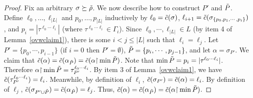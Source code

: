 \begin{proof}
Fix an arbitrary $\sigma\succeq\tilde{\rho}$.
We now describe how to construct $P'$ and $\tilde{P}$.
Define $\ell_0, \dots, \ell_{|L|}$
and $p_0, \dots, p_{|L|}$ inductively by
$\ell_0 = \tilde{c}(\sigma)$,
$\ell_{i+1} = \tilde{c}(\sigma_{\{p_0,p_1,\cdots,p_i\}})$, and
$p_{i} =|\tau^{\ell_0\cdots \ell_{i}}|$ (where $\tau^{\ell_0\cdots \ell_{i}} \in \Gamma_i$).
%
%
%
%
%
%
Since $\ell_0,\cdots,\ell_{|L|}\in L$ (by item 4 of Lemma~\ref{ovwclaim1}), there is some $i<j\leq |L|$
such that $\ell_i=\ell_j $.
Let $P' = \{p_0,\cdots,p_{i-1}\}$
(if $i=0$ then $P' = \emptyset$),
$\tilde{P}= \{p_i,\cdots,p_{j-1}\}$,
and let $\alpha = \sigma_{P'}$. We claim that
$\tilde{c}(\alpha) = \tilde{c}(\alpha_{\tilde{P}}) = \tilde{c}(\alpha{\upharpoonright} \min \tilde{P})$.
Note that $\min \tilde{P}  =p_i= |\tau^{\ell_0\cdots \ell_i}|$.
Therefore
$\alpha{\upharpoonright} \min \tilde{P} = \tau^{\ell_0\cdots \ell_i}_{P'}$.
By item 3 of Lemma~\ref{ovwclaim1},
we have $\tilde{c}(\tau^{\ell_0\cdots \ell_i}_{P'}) = \ell_i $.
Meanwhile, by definition of $\ell_i$,
$\tilde{c}(\sigma_{P'}) =
\tilde{c}(\alpha) = \ell_i$.
By definition of $\ell_j$,
$\tilde{c}(\sigma_{P'\cup \tilde{P}}) =
\tilde{c}(\alpha_{\tilde{P}}) = \ell_j$.
Thus, $\tilde{c}(\alpha) = \tilde{c}(\alpha_{\tilde{P}})
 = \tilde{c}(\alpha{\upharpoonright} \min \tilde{P} )$.


\end{proof}

